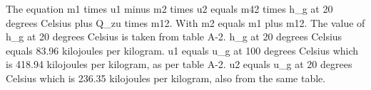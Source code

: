 The equation m1 times u1 minus m2 times u2 equals m42 times h_g at 20 degrees Celsius plus Q_zu times m12. With m2 equals m1 plus m12. The value of h_g at 20 degrees Celsius is taken from table A-2. h_g at 20 degrees Celsius equals 83.96 kilojoules per kilogram. u1 equals u_g at 100 degrees Celsius which is 418.94 kilojoules per kilogram, as per table A-2. u2 equals u_g at 20 degrees Celsius which is 236.35 kilojoules per kilogram, also from the same table.
